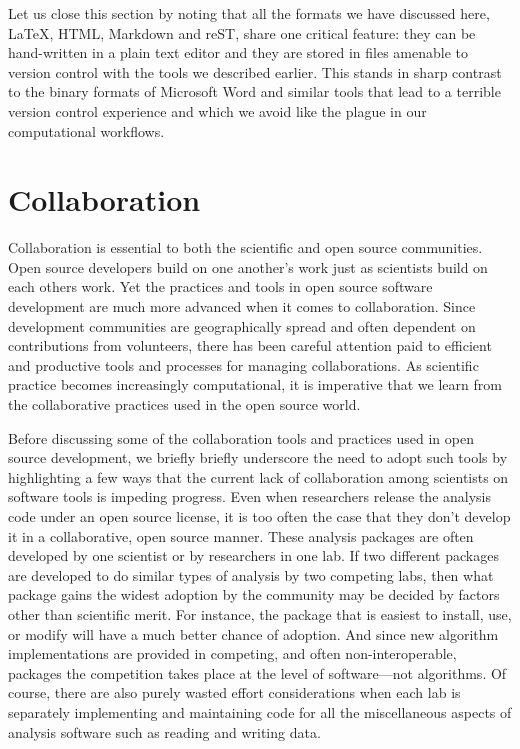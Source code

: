 \documentclass[ChapterTOCs,krantz2]{krantz} %
\begin{document}
Let us close this section by noting that all the formats we have discussed
here, \LaTeX{}, HTML, Markdown and reST, share one critical feature: they can
be hand-written in a plain text editor and they are stored in files amenable to
version control with the tools we described earlier.  This stands in sharp
contrast to the binary formats of Microsoft Word and similar tools that lead to
a terrible version control experience and which we avoid like the plague in our
computational workflows.

\section{\label{sec:collaboration}Collaboration}

Collaboration is essential to both the scientific and open source communities.
Open source developers build on one another's work just as scientists build on
each others work.  Yet the practices and tools in open source software
development are much more advanced when it comes to collaboration. Since
development communities are geographically spread and often dependent on
contributions from volunteers, there has been careful attention paid to
efficient and productive tools and processes for managing collaborations.  As
scientific practice becomes increasingly computational, it is imperative that
we learn from the collaborative practices used in the open source world.

Before discussing some of the collaboration tools and practices used in open
source development, we briefly briefly underscore the need to adopt such tools
by highlighting a few ways that the current lack of collaboration among
scientists on software tools is impeding progress. Even when researchers
release the analysis code under an open source license, it is too often the
case that they don't develop it in a collaborative, open source manner.
These analysis packages are often developed by one scientist or by researchers
in one lab. If two different packages are developed to do similar types
of analysis by two competing labs, then what package gains the widest adoption
by the community may be decided by factors other than scientific merit. For
instance, the package that is easiest to install, use, or modify will have
a much better chance of adoption. And since new algorithm implementations
are provided in competing, and often non-interoperable, packages the
competition takes place at the level of software---not algorithms. Of course,
there are also purely wasted effort considerations when each lab is separately
implementing and maintaining code for all the miscellaneous aspects of
analysis software such as reading and writing data.
\end{document}
